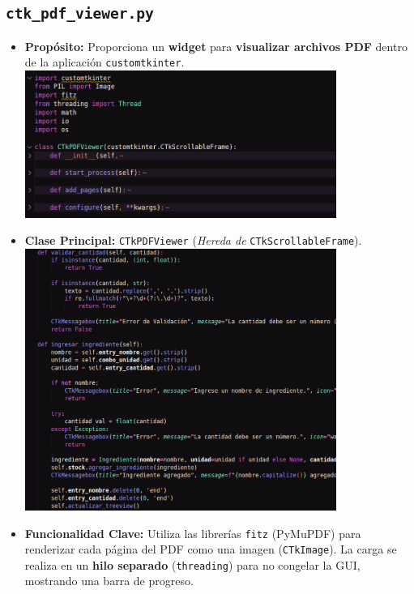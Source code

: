 \documentclass[a4paper, 12pt]{article}
\begin{document}
\subsection{\texttt{ctk\_pdf\_viewer.py}}
\begin{itemize}
    \item \textbf{Propósito:} Proporciona un \textbf{widget} para \textbf{visualizar archivos PDF} dentro de la aplicación \texttt{customtkinter}.\\
\includegraphics[width=0.8\textwidth]{images/10.png}
    \item \textbf{Clase Principal:} \texttt{CTkPDFViewer} (\textit{Hereda de} \texttt{CTkScrollableFrame}).\\
\includegraphics[width=0.8\textwidth]{images/11.png}
    \item \textbf{Funcionalidad Clave:} Utiliza las librerías \texttt{fitz} (PyMuPDF) para renderizar cada página del PDF como una imagen (\texttt{CTkImage}). La carga se realiza en un \textbf{hilo separado} (\texttt{threading}) para no congelar la GUI, mostrando una barra de progreso.
\end{itemize}
\newpage
\end{document}
